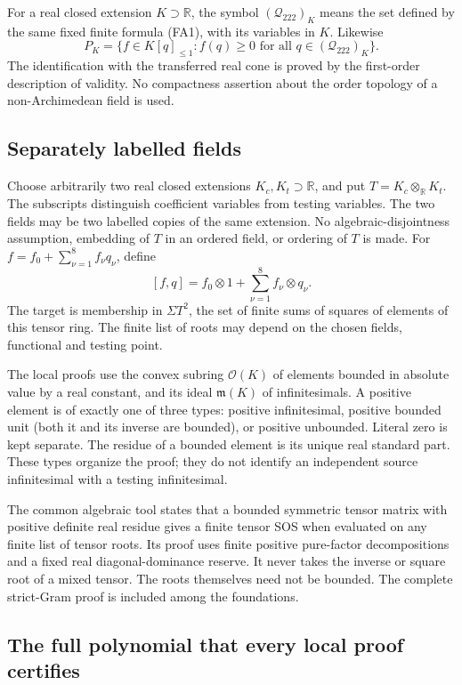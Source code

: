 For a real closed extension $K\supset\mathbb R$, the symbol
$(\mathcal Q_{222})_K$ means the set defined by the same fixed finite
formula (FA1), with its variables in $K$.  Likewise
\[
 P_K=\{f\in K[q]_{\le1}:f(q)\ge0\text{ for all }
                              q\in(\mathcal Q_{222})_K\}.       \tag{FA2}
\]
The identification with the transferred real cone is proved by the
first-order description of validity.  No compactness assertion about
the order topology of a non-Archimedean field is used.

\subsection*{Separately labelled fields}

Choose arbitrarily two real closed extensions $K_c,K_t\supset\mathbb R$,
and put $T=K_c\otimes_{\mathbb R}K_t$.  The subscripts distinguish
coefficient variables from testing variables.  The two fields may be
two labelled copies of the same extension.  No algebraic-disjointness
assumption, embedding of $T$ in an ordered field, or ordering of $T$
is made.  For $f=f_0+\sum_{\nu=1}^8 f_\nu q_\nu$, define
\[
 [f,q]=f_0\otimes1+\sum_{\nu=1}^8 f_\nu\otimes q_\nu.           \tag{FA3}
\]
The target is membership in $\Sigma T^2$, the set of finite sums of
squares of elements of this tensor ring.  The finite list of roots may
depend on the chosen fields, functional and testing point.

The local proofs use the convex subring $\mathcal O(K)$ of elements
bounded in absolute value by a real constant, and its ideal
$\mathfrak m(K)$ of infinitesimals.  A positive element is of exactly
one of three types: positive infinitesimal, positive bounded unit
(both it and its inverse are bounded), or positive unbounded.
Literal zero is kept separate.  The residue of a bounded element is
its unique real standard part.  These types organize the proof;
they do not identify an independent source infinitesimal with a
testing infinitesimal.

The common algebraic tool states that a bounded symmetric tensor
matrix with positive definite real residue gives a finite tensor SOS
when evaluated on any finite list of tensor roots.  Its proof uses
finite positive pure-factor decompositions and a fixed real
diagonal-dominance reserve.  It never takes the inverse or square
root of a mixed tensor.  The roots themselves need not be bounded.
The complete strict-Gram proof is included among the foundations.

\subsection*{The full polynomial that every local proof certifies}

